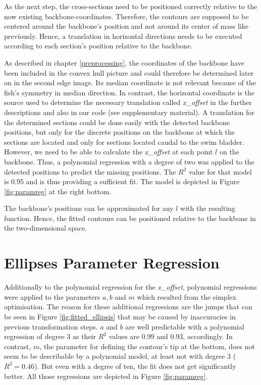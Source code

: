 As the next step, the cross-sections need to be positioned correctly relative to the now existing backbone-coordinates. Therefore, the contours are supposed to be centered around the backbone's position and not around its center of mass like previously. Hence, a translation in horizontal directions needs to be executed according to each section's position relative to the backbone. 

As described in chapter \ref{preprocessing}, the coordinates of the backbone have been included in the convex hull picture and could therefore be determined later on in the second edge image. Its median coordinate is not relevant because of the fish's symmetry in median direction. In contrast, the horizontal coordinate is the source used to determine the necessary translation called \textit{x\_offset} in the further descriptions and also in our code (see supplementary material). A translation for the determined sections could be done easily with the detected backbone positions, but only for the discrete positions on the backbone at which the sections are located and only for sections located caudal to the swim bladder. However, we need to be able to calculate the \textit{x\_offset} at each point $l$ on the backbone. Thus, a polynomial regression with a degree of two was applied to the detected positions to predict the missing positions. The $R^2$ value for that model is 0.95 and is thus providing a sufficient fit. The model is depicted in Figure \ref{fig:paramreg} at the right bottom.

The backbone's positions can be approximated for any $l$ with the resulting function. Hence, the fitted contours can be positioned relative to the backbone in the two-dimensional space.

\section{Ellipses Parameter Regression}
    \label{parameterregression}
    
Additionally to the polynomial regression for the \textit{x\_offset}, polynomial regressions were applied to the parameters $a,b$ and $m$ which resulted from the simplex optimisation. The reason for these additional regressions are the jumps that can be seen in Figure \ref{fig:fitted_ellipsis} that may be caused by inaccuracies in previous transformation steps. $a$ and $b$ are well predictable with a polynomial regression of degree 3 as their $R^2$ values are 0.99 and 0.93, accordingly. In contrast, $m$, the parameter for defining the contour's tip at the bottom, does not seem to be describable by a polynomial model, at least not with degree 3 ($R^2 = 0.46$). But even with a degree of ten, the fit does not get significantly better. All those regressions are depicted in Figure \ref{fig:paramreg}. 

